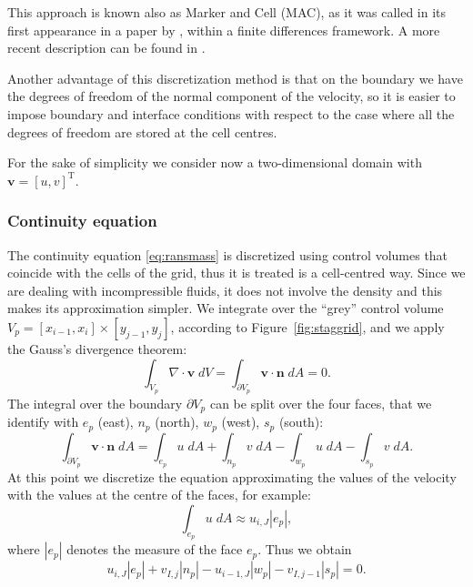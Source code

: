 This approach is known also as Marker and Cell (MAC), as it was called in its 
first appearance in a paper by \textcite{stagg:orig}, within a finite 
differences framework. A more recent description can be found in 
\cite{main:vermal}.

Another advantage of this discretization method is that on the boundary we have 
the degrees of freedom of the normal component of the velocity, so it is easier 
to impose boundary and interface conditions with respect to the case where all the degrees of freedom are stored at the cell centres.

For the sake of simplicity we consider now a two-dimensional domain with 
$\mathbf{v} = [u, v]^{\mathrm{T}}$.
%
\subsubsection{Continuity equation}
The continuity equation \eqref{eq:ransmass} is discretized using control 
volumes that coincide with the cells of the grid, thus it is treated is a 
cell-centred way. Since we are dealing with incompressible fluids, it does not 
involve the density and this makes its approximation simpler.
We integrate over the ``grey'' control volume $V_p = [x_{i-1},x_i] \times 
[y_{j-1},y_j]$, according to Figure~\ref{fig:staggrid}, and we apply the 
Gauss's divergence theorem:
\begin{equation}
\int_{V_p} \nabla \cdot \mathbf{v} \; dV = \int_{\partial V_p} \mathbf{v} \cdot 
\mathbf{n} \; dA = 0. 
\end{equation}
The integral over the boundary $\partial V_p$ can be split over the four faces, 
that we identify with $e_p$ (east), $n_p$ (north), $w_p$ (west), $s_p$ (south):
\begin{equation}
\int_{\partial V_p} \mathbf{v} \cdot \mathbf{n} \; dA = \int_{e_p} u \; dA
+ \int_{n_p} v \; dA - \int_{w_p} u \; dA - \int_{s_p} v \; dA.
\end{equation}
At this point we discretize the equation approximating the values of the 
velocity with the values at the centre of the faces, for example:
\begin{equation}
\int_{e_p} u \; dA \approx u_{i,J} |e_p|,
\end{equation}
where $|e_p|$ denotes the measure of the face $e_p$. Thus we obtain
\begin{equation}
	u_{i,J} |e_p| + v_{I,j}|n_p| - u_{i-1,J}|w_p| - v_{I,j-1}|s_p| = 0.
\end{equation}
%
